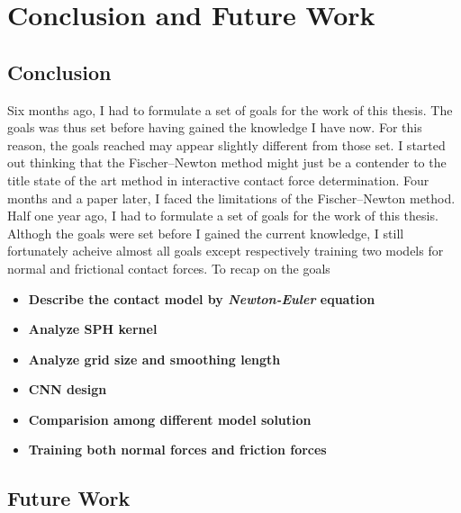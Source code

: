 \chapter{Conclusion and Future Work}

\section{Conclusion}
Six months ago, I had to formulate a set of goals for the work of this thesis. The goals was thus set before having gained the knowledge I have now. For this reason, the goals reached may appear slightly different from those set. I started out thinking that the Fischer–Newton method might just be a contender to the title state of the art method in interactive contact force determination. Four months and a paper later, I faced the limitations of the Fischer–Newton method. \\

Half one year ago, I had to formulate a set of goals for the work of this thesis. Althogh the goals were set before I gained the current knowledge, I still fortunately acheive almost all goals except respectively training two models for normal and frictional contact forces. To recap on the goals
\begin{itemize}
    \item \textbf{Describe the contact model by \textit{Newton-Euler} equation}
    \item \textbf{Analyze SPH kernel}
    \item \textbf{Analyze grid size and smoothing length}
    \item \textbf{CNN design}
    \item \textbf{Comparision among different model solution}
    \item \textbf{Training both normal forces and friction forces}
\end{itemize}

\section{Future Work}